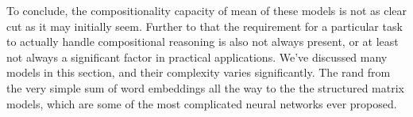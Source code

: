 \documentclass[12pt,parskip]{komatufte}
\begin{document}
To conclude, the compositionality capacity of mean of these models is not as clear cut as it may initially seem.
Further to that the requirement for a particular task to actually handle compositional reasoning is also not always present, or at least not always a significant factor in practical applications.
We've discussed many models in this section, and their complexity varies significantly.
The rand from the very simple sum of word embeddings all the way to the the structured matrix models,
which are some of the most complicated neural networks ever proposed.
\end{document}
